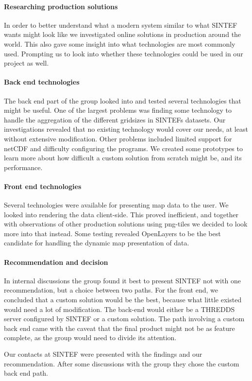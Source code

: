\documentclass[11pt,a4paper,titlepage,oneside]{report}
\begin{document}
\paragraph{Researching production solutions}
In order to better understand what a modern system similar to what SINTEF wants might look like we investigated online solutions in production around the world. This also gave some insight into what technologies are most commonly used. Prompting us to look into whether these technologies could be used in our project as well.

\paragraph{Back end technologies}
The back end part of the group looked into and tested several technologies that might be useful. One of the largest problems was finding some technology to handle the aggregation of the different gridsizes in SINTEFs datasets. Our investigations revealed that no existing technology would cover our needs, at least without extensive modification. Other problems included limited support for netCDF and difficulty configuring the programs. We created some prototypes to learn more about how difficult a custom solution from scratch might be, and its performance.

\paragraph{Front end technologies}
Several technologies were available for presenting map data to the user. We looked into rendering the data client-side. This proved inefficient, and together with observations of other production solutions using png-tiles we decided to look more into that instead. Some testing revealed OpenLayers to be the best candidate for handling the dynamic map presentation of data.

\paragraph{Recommendation and decision}
In internal discussions the group found it best to present SINTEF not with one recommendation, but a choice between two paths. For the front end, we concluded that a custom solution would be the best, because what little existed would need a lot of modification. The back-end would either be a THREDDS server configured by SINTEF or a custom solution. The path involving a custom back end came with the caveat that the final product might not be as feature complete, as the group would need to divide its attention.
\par Our contacts at SINTEF were presented with the findings and our recommendation. After some discussions with the group they chose the custom back end path.
\end{document}
